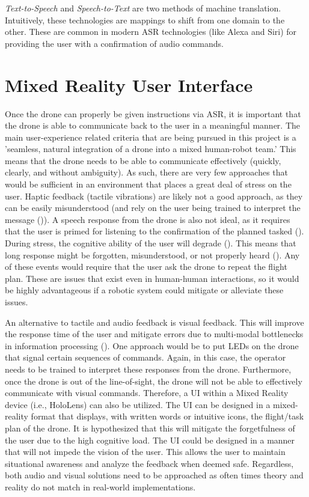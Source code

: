 \textit{Text-to-Speech} and \textit{Speech-to-Text} are two methods of machine translation. Intuitively, these technologies are mappings to shift from one domain to the other. These are common in modern ASR technologies (like Alexa and Siri) for providing the user with a confirmation of audio commands. 

\section{Mixed Reality User Interface}
Once the drone can properly be given instructions via ASR, it is important that the drone is able to communicate back to the user in a meaningful manner. The main user-experience related criteria that are being pursued in this project is a 'seamless, natural integration of a drone into a mixed human-robot team.' This means that the drone needs to be able to communicate effectively (quickly, clearly, and without ambiguity). As such, there are very few approaches that would be sufficient in an environment that places a great deal of stress on the user. Haptic feedback (tactile vibrations) are likely not a good approach, as they can be easily misunderstood (and rely on the user being trained to interpret the message (\cite{Cho2003})). A speech response from the drone is also not ideal, as it requires that the user is primed for listening to the confirmation of the planned tasked (\cite{dysoncognitive}). During stress, the cognitive ability of the user will degrade (\cite{Broadbent1958-BROPAC-3}). This means that long response might be forgotten, misunderstood, or not properly heard (\cite{Engle}). Any of these events would require that the user ask the drone to repeat the flight plan. These are issues that exist even in human-human interactions, so it would be highly advantageous if a robotic system could mitigate or alleviate these issues. 
\smallskip

An alternative to tactile and audio feedback is visual feedback. This will improve the response time of the user and mitigate errors due to multi-modal bottlenecks in information processing (\cite{Sommer2001MultipleBI}). One approach would be to put LEDs on the drone that signal certain sequences of commands. Again, in this case, the operator needs to be trained to interpret these responses from the drone. Furthermore, once the drone is out of the line-of-sight, the drone will not be able to effectively communicate with visual commands. Therefore, a UI within a Mixed Reality device (i.e., HoloLens) can also be utilized. The UI can be designed in a mixed-reality format that displays, with written words or intuitive icons, the flight/task plan of the drone. It is hypothesized that this will mitigate the forgetfulness of the user due to the high cognitive load. The UI could be designed in a manner that will not impede the vision of the user. This allows the user to maintain situational awareness and analyze the feedback when deemed safe. Regardless, both audio and visual solutions need to be approached as often times theory and reality do not match in real-world implementations. 

